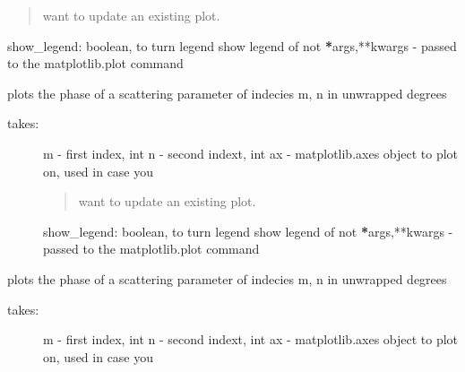 \documentclass[letterpaper,10pt,english]{sphinxmanual}
\begin{document}
\begin{fulllineitems}
\begin{fulllineitems}
\begin{description}
\begin{quote}
want to update an existing plot.
\end{quote}

show\_legend: boolean, to turn legend show legend of not
{\color{red}\bfseries{}*}args,**kwargs - passed to the matplotlib.plot command

\end{description}

\end{fulllineitems}


\begin{fulllineitems}
\label{api/mwavepy:mwavepy.network.Network.plot_s_deg_unwrap}
plots the phase of a scattering parameter of indecies m, n in
unwrapped degrees
\begin{description}
\item[{takes:}] \leavevmode
m - first index, int
n - second indext, int
ax - matplotlib.axes object to plot on, used in case you
\begin{quote}

want to update an existing plot.
\end{quote}

show\_legend: boolean, to turn legend show legend of not
{\color{red}\bfseries{}*}args,**kwargs - passed to the matplotlib.plot command

\end{description}

\end{fulllineitems}


\begin{fulllineitems}
\label{api/mwavepy:mwavepy.network.Network.plot_s_deg_unwrapped}
plots the phase of a scattering parameter of indecies m, n in
unwrapped degrees
\begin{description}
\item[{takes:}] \leavevmode
m - first index, int
n - second indext, int
ax - matplotlib.axes object to plot on, used in case you
\begin{quote}


\end{quote}
\end{description}
\end{fulllineitems}
\end{fulllineitems}
\end{document}

